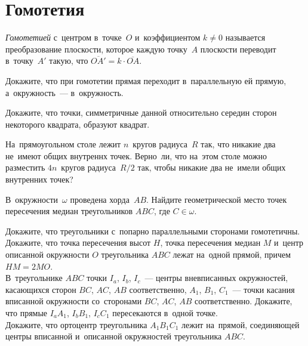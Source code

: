
\section*{Гомотетия}


\begingroup
    \def\ov{\overline}%

\emph{Гомотетией} с~центром в~точке~$O$ и~коэффициентом $k \neq 0$ называется
преобразование плоскости, которое каждую точку~$A$ плоскости переводит
в~точку~$A'$ такую, что $\ov{OA'} = k \cdot \ov{OA}$.

\begin{problems}

\item
Докажите, что при гомотетии прямая переходит в~параллельную ей прямую,
а~окружность~--- в~окружность.

\item
Докажите, что точки, симметричные данной относительно середин сторон
некоторого квадрата, образуют квадрат.

\item
На~прямоугольном столе лежит $n$~кругов радиуса~$R$ так, что никакие два
не~имеют общих внутреннх точек.
Верно~ли, что на~этом столе можно разместить $4 n$~кругов радиуса~$R / 2$ так,
чтобы никакие два не~имели общих внутренних точек?

\item
В~окружности~$\omega$ проведена хорда~$AB$.
Найдите геометрической место точек пересечения медиан треугольников $ABC$, где
$C \in \omega$.

\item
\subproblem
Докажите, что треугольники с~попарно параллельными сторонами гомотетичны.
\\
\subproblem
Докажите, что точка пересечения высот $H$, точка пересечения медиан $M$
и~центр описанной окружности $O$ треугольника $ABC$ лежат на~одной прямой,
причем $HM = 2 MO$.
\\
\subproblem
В~треугольнике $ABC$ точки $I_{a}$, $I_{b}$, $I_{c}$~--- центры вневписанных
окружностей, касающихся сторон $BC$, $AC$, $AB$ соответственно,
$A_1$, $B_1$, $C_1$~--- точки касания вписанной окружности со~сторонами
$BC$, $AC$, $AB$ соответственно.
Докажите, что прямые $I_{a} A_1$, $I_{b} B_1$, $I_{c} C_1$ пересекаются
в~одной точке.
\\
\subproblem
Докажите, что ортоцентр треугольника $A_1 B_1 C_1$ лежит на~прямой, соединяющей
центры вписанной и~описанной окружностей треугольника $ABC$.


\end{problems}
